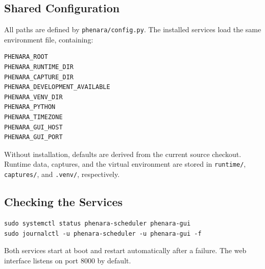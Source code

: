 \subsection{Shared Configuration}

All paths are defined by \texttt{phenara/config.py}. The installed services
load the same environment file, containing:

\begin{verbatim}
PHENARA_ROOT
PHENARA_RUNTIME_DIR
PHENARA_CAPTURE_DIR
PHENARA_DEVELOPMENT_AVAILABLE
PHENARA_VENV_DIR
PHENARA_PYTHON
PHENARA_TIMEZONE
PHENARA_GUI_HOST
PHENARA_GUI_PORT
\end{verbatim}

Without installation, defaults are derived from the current source checkout.
Runtime data, captures, and the virtual environment are stored in
\texttt{runtime/}, \texttt{captures/}, and \texttt{.venv/}, respectively.

\subsection{Checking the Services}

\begin{verbatim}
sudo systemctl status phenara-scheduler phenara-gui
sudo journalctl -u phenara-scheduler -u phenara-gui -f
\end{verbatim}

Both services start at boot and restart automatically after a failure. The web
interface listens on port 8000 by default.
